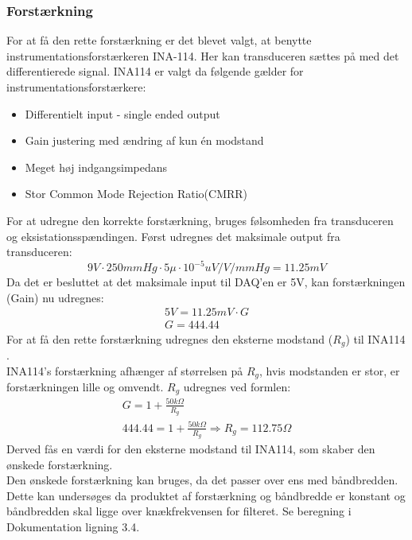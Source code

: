 \subsubsection{Forstærkning}
For at få den rette forstærkning er det blevet valgt, at benytte instrumentationsforstærkeren INA-114. Her kan transduceren sættes på med det differentierede signal. INA114 er valgt da følgende gælder\cite{Instrumentation} for instrumentationsforstærkere: 
\begin{itemize}
	\item Differentielt input - single ended output 
	\item Gain justering med ændring af kun én modstand 
	\item Meget høj indgangsimpedans 
	\item Stor Common Mode Rejection Ratio(CMRR)
\end{itemize}
For at udregne den korrekte forstærkning, bruges følsomheden fra transduceren og eksistationsspændingen.
Først udregnes det maksimale output fra transduceren:   
\begin{equation}
9V\cdot 250mmHg \cdot 5\mu\cdot 10^{-5} uV/V/mmHg  = 11.25mV
\end{equation} 
Da det er besluttet at det maksimale input til DAQ'en \cite{DSB} er 5V, kan forstærkningen (Gain) nu udregnes: 
\begin{equation}
\begin{split}
5V= 11.25mV \cdot G \\
G = 444.44
\end{split}
\end{equation}
For at få den rette forstærkning udregnes den eksterne modstand ($ R_g $) til INA114 \cite{INA}.\\ 
INA114's forstærkning afhænger af størrelsen på $ R_g $, hvis modstanden er stor, er forstærkningen lille og omvendt.  $ R_g $ udregnes ved formlen: 
\begin{equation}
\begin{split}
G=1+\frac{50k\Omega}{R_g}\\
444.44= 1+\frac{50k\Omega}{R_g} \Rightarrow R_g= 112.75 \Omega
\end{split}
\end{equation}
Derved fås en værdi for den eksterne modstand til INA114, som skaber den ønskede forstærkning.\\
\newline
Den ønskede forstærkning kan bruges, da det passer over ens med båndbredden. Dette kan undersøges da produktet af forstærkning og båndbredde er konstant og båndbredden skal ligge over knækfrekvensen for filteret. Se beregning i Dokumentation ligning 3.4.\\
